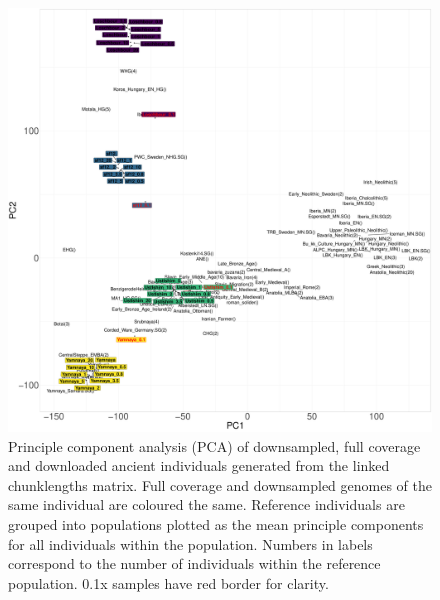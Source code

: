 \begin{figure}[htp]
    \centering
    \includegraphics[width=1.0\textwidth]{../images/chapter1/PCA_panel_allInds.allCoverage.pdf}
    \caption{Principle component analysis (PCA) of downsampled, full coverage and downloaded ancient individuals generated from the linked chunklengths matrix. Full coverage and downsampled genomes of the same individual are coloured the same. Reference individuals are grouped into populations plotted as the mean principle components for all individuals within the population. Numbers in labels correspond to the number of individuals within the reference population. 0.1x samples have red border for clarity.}
    \label{fig:PCA_panel_allInds_allCoverage}
\end{figure}

